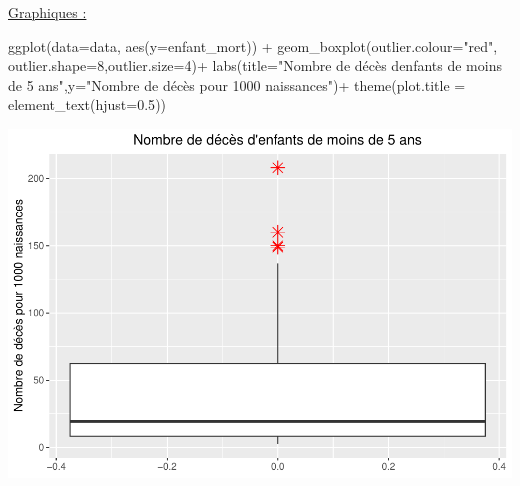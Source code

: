 \documentclass[
]{article}
\newenvironment{Shaded}{\begin{snugshade}}{\end{snugshade}}
\newcommand{\AttributeTok}[1]{\textcolor[rgb]{0.77,0.63,0.00}{#1}}
\newcommand{\DecValTok}[1]{\textcolor[rgb]{0.00,0.00,0.81}{#1}}
\newcommand{\FloatTok}[1]{\textcolor[rgb]{0.00,0.00,0.81}{#1}}
\newcommand{\FunctionTok}[1]{\textcolor[rgb]{0.00,0.00,0.00}{#1}}
\newcommand{\NormalTok}[1]{#1}
\newcommand{\SpecialCharTok}[1]{\textcolor[rgb]{0.00,0.00,0.00}{#1}}
\newcommand{\StringTok}[1]{\textcolor[rgb]{0.31,0.60,0.02}{#1}}
\begin{document}
\uline{Graphiques :}

\begin{Shaded}
\begin{Highlighting}[]
\FunctionTok{ggplot}\NormalTok{(}\AttributeTok{data=}\NormalTok{data, }\FunctionTok{aes}\NormalTok{(}\AttributeTok{y=}\NormalTok{enfant\_mort)) }\SpecialCharTok{+} 
  \FunctionTok{geom\_boxplot}\NormalTok{(}\AttributeTok{outlier.colour=}\StringTok{"red"}\NormalTok{, }\AttributeTok{outlier.shape=}\DecValTok{8}\NormalTok{,}\AttributeTok{outlier.size=}\DecValTok{4}\NormalTok{)}\SpecialCharTok{+}
  \FunctionTok{labs}\NormalTok{(}\AttributeTok{title=}\StringTok{"Nombre de décès d\textquotesingle{}enfants de moins de 5 ans"}\NormalTok{,}\AttributeTok{y=}\StringTok{"Nombre de décès pour 1000 naissances"}\NormalTok{)}\SpecialCharTok{+}
  \FunctionTok{theme}\NormalTok{(}\AttributeTok{plot.title =} \FunctionTok{element\_text}\NormalTok{(}\AttributeTok{hjust=}\FloatTok{0.5}\NormalTok{))}
\end{Highlighting}
\end{Shaded}

\includegraphics{projet_apprentissage_non_supp_files/figure-latex/unnamed-chunk-5-1.pdf}
\end{document}
